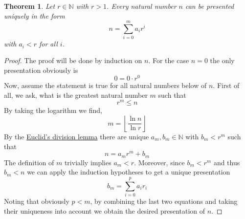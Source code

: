 \documentclass[17pt]{extarticle}
\newtheorem{theorem}{Theorem}
\begin{document}
\begin{theorem}
	Let $r\in\mathbb{N}$ with $r>1$.
	Every natural number $n$ can be presented uniquely in the form
	$$n=\sum_{i=0}^m a_i r^i$$
	with $a_i<r$ for all $i$.
\end{theorem}
\begin{proof}
	The proof will be done by induction on $n$. For the case $n=0$ the only presentation obviously
	is
	$$0=0\cdot r^0$$
	Now, assume the statement is true for all natural numbers below of $n$.
	First of all, we ask, what is the greatest natural number $m$ such that 
	$$r^{m}\leq n$$
	By taking the logarithm we find,
	$$m=\left\lfloor\frac{\ln n}{\ln r}\right\rfloor$$
	By the \href{https://en.wikipedia.org/wiki/Euclidean_division#Division_theorem}{Euclid's division lemma}
	there are unique $a_m, b_m\in\mathbb{N}$ with $b_m<r^m$ such that
	$$n=a_m r^m+b_m$$
	The definition of $m$ trivially implies $a_m<r$.
	Moreover, since $b_m<r^m$ and thus $b_m<n$ we can apply the induction hypotheses to get a unique presentation
	$$b_m=\sum_{i=0}^p a_i r_i$$
	Noting that obviously $p<m$, by combining the last two equations and taking their uniqueness into account we obtain the desired presentation of $n$.	
\end{proof}
\end{document}
